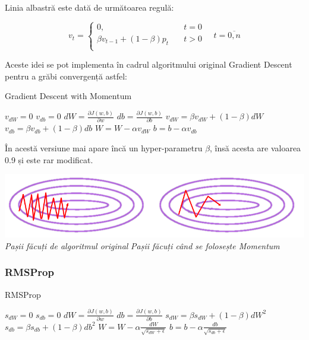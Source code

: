 Linia albastră este dată de următoarea regulă:

\[
v_t=
	\begin{cases}
		\text{0,} &\quad t=0 \\
		\beta v_{t-1} + (1-\beta)p_t &\quad t > 0 \\
	\end{cases}
\quad t=\overline{0,n}
\]

Aceste idei se pot implementa în cadrul algoritmului original Gradient Descent pentru a grăbi convergență astfel:

\begin{algorithm}
\caption{Gradient Descent with Momentum}
\begin{algorithmic}[2]
\State $v_{dW} = 0$
$v_{db} = 0$
\State $dW = \frac{\partial J(w,b)}{\partial w}$
\State $db = \frac{\partial J(w,b)}{\partial b}$
\State $v_{dW} = \beta v_{dW} + (1-\beta)dW$
\State $v_{db} = \beta v_{db} + (1-\beta)db$
\State $W = W - \alpha v_{dW}$
\State $b = b - \alpha v_{db}$
\EndWhile
\end{algorithmic}
\end{algorithm}

În acestă versiune mai apare încă un hyper-parametru $\beta$, însă acesta are valoarea 0.9 și este rar modificat.

\begin{center}
\includegraphics[scale=0.5]{momentum} \\
\textit{Pașii făcuți de algoritmul original} \quad \textit{Pașii făcuți când se folosește Momentum}
\end{center}

\subsubsection{RMSProp}

\begin{algorithm}
\caption{RMSProp}
\begin{algorithmic}[3]
\State $s_{dW} = 0$
$s_{db} = 0$
\State $dW = \frac{\partial J(w,b)}{\partial w}$
\State $db = \frac{\partial J(w,b)}{\partial b}$
\State $s_{dW} = \beta s_{dW} + (1-\beta)dW^2$
\State $s_{db} = \beta s_{db} + (1-\beta)db^2$
\State $\displaystyle{W = W - \alpha \frac{dW}{\sqrt{s_{dW} + \epsilon}}}$
\State $\displaystyle{b = b - \alpha \frac{db}{\sqrt{s_{db} + \epsilon}}}$
\EndWhile
\end{algorithmic}
\end{algorithm}

